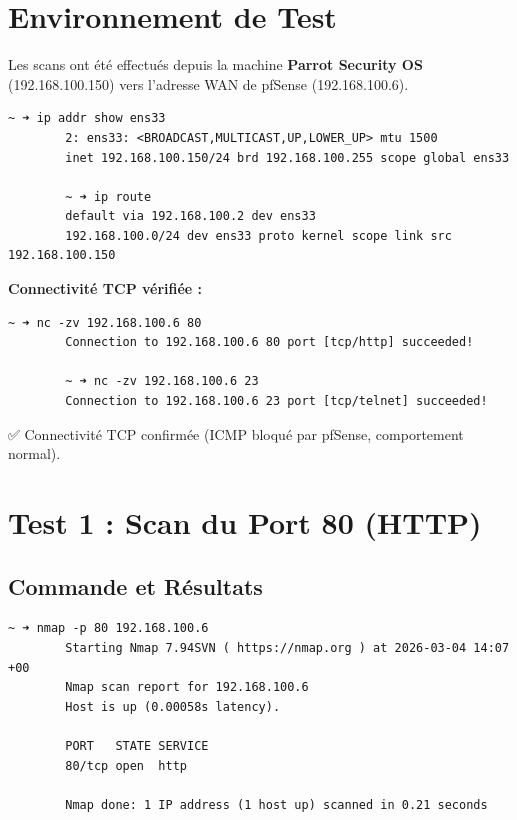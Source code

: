 \documentclass[12pt,a4paper,openany]{report}
\begin{document}
	\section{Environnement de Test}
	Les scans ont été effectués depuis la machine \textbf{Parrot Security OS} (192.168.100.150) vers l'adresse WAN de pfSense (192.168.100.6).
	
	\begin{lstlisting}[caption=Configuration réseau de Parrot Security]
		~ ➜ ip addr show ens33
		2: ens33: <BROADCAST,MULTICAST,UP,LOWER_UP> mtu 1500
		inet 192.168.100.150/24 brd 192.168.100.255 scope global ens33
		
		~ ➜ ip route
		default via 192.168.100.2 dev ens33
		192.168.100.0/24 dev ens33 proto kernel scope link src 192.168.100.150
	\end{lstlisting}
	
	\textbf{Connectivité TCP vérifiée :}
	\begin{lstlisting}[caption=Vérification préliminaire avec netcat]
		~ ➜ nc -zv 192.168.100.6 80
		Connection to 192.168.100.6 80 port [tcp/http] succeeded!
		
		~ ➜ nc -zv 192.168.100.6 23
		Connection to 192.168.100.6 23 port [tcp/telnet] succeeded!
	\end{lstlisting}
	
	✅ Connectivité TCP confirmée (ICMP bloqué par pfSense, comportement normal).
	
	\section{Test 1 : Scan du Port 80 (HTTP)}
	\subsection{Commande et Résultats}
	\begin{lstlisting}[caption=Scan Nmap du port HTTP]
		~ ➜ nmap -p 80 192.168.100.6
		Starting Nmap 7.94SVN ( https://nmap.org ) at 2026-03-04 14:07 +00
		Nmap scan report for 192.168.100.6
		Host is up (0.00058s latency).
		
		PORT   STATE SERVICE
		80/tcp open  http
		
		Nmap done: 1 IP address (1 host up) scanned in 0.21 seconds
	\end{lstlisting}
	
\end{document}
